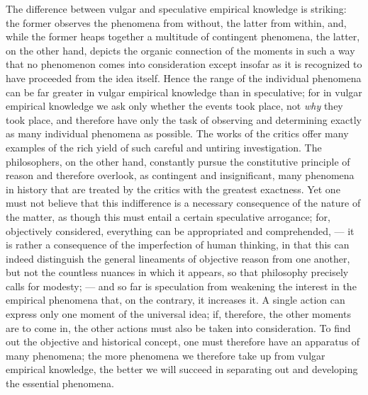 \documentclass[12pt]{book}
\newcommand{\opage}[1]{\marginnote{\footnotesize\textit{[#1]}}}
\begin{document}
The difference between vulgar and speculative empirical knowledge is striking:
the former observes the phenomena from without, the latter from within, and,
while the former heaps together a multitude of contingent phenomena, the latter,
on the other hand, depicts the organic connection of the moments in such a way
that no phenomenon comes into consideration except insofar as it is recognized
to have proceeded from the idea itself. Hence the range of the individual
phenomena can be far greater in vulgar empirical knowledge than in speculative;
for in vulgar empirical knowledge we ask only whether the events took place,
not \emph{why} they took place, and therefore have only the task of observing
and determining exactly as many individual phenomena as possible. The works of
the critics offer many examples of the rich yield of such careful and untiring
investigation. The philosophers, on the other hand, constantly pursue the
constitutive principle of reason and therefore overlook, as contingent and
insignificant, many phenomena in history that are treated by the critics with
the greatest exactness. Yet one must not believe that this indifference is a
necessary consequence of the nature of the matter, as though this must entail a
certain speculative arrogance; for, objectively considered, everything can be
appropriated and comprehended, --- it is rather a consequence of the
imperfection
\opage{26} of human thinking, in that this can indeed distinguish the general lineaments
of objective reason from one another, but not the countless nuances in which it
appears, so that philosophy precisely calls for modesty; --- and so far is
speculation from weakening the interest in the empirical phenomena that, on the
contrary, it increases it. A single action can express only one moment of the
universal idea; if, therefore, the other moments are to come in, the other
actions must also be taken into consideration. To find out the objective and
historical concept, one must therefore have an apparatus of many phenomena; the
more phenomena we therefore take up from vulgar empirical knowledge, the better
we will succeed in separating out and developing the essential phenomena.
\end{document}
